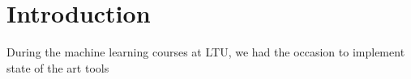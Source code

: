 \section{Introduction}
	During the machine learning courses at LTU, we had the occasion to implement state of the art tools